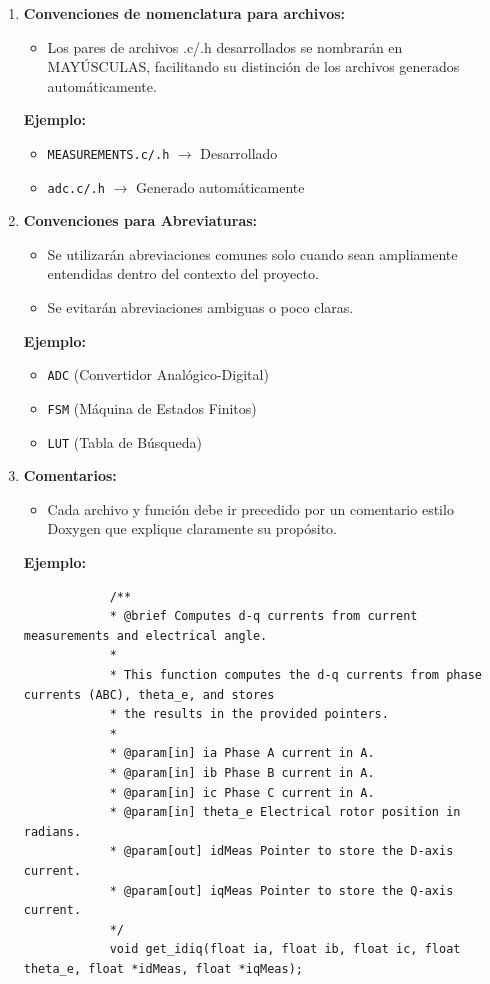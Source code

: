 \begin{enumerate}
\begin{itemize}
	\end{itemize}
	\item \textbf{Convenciones de nomenclatura para archivos:}
	\begin{itemize}
		\item Los pares de archivos .c/.h desarrollados se nombrarán en MAYÚSCULAS, facilitando su distinción de los archivos generados automáticamente.
	\end{itemize}
	\textbf{Ejemplo:}
	\begin{itemize}
		\item \texttt{MEASUREMENTS.c/.h} $\rightarrow$ Desarrollado
		\item \texttt{adc.c/.h} $\rightarrow$ Generado automáticamente
	\end{itemize}
	\item \textbf{Convenciones para Abreviaturas:}
	\begin{itemize}
		\item Se utilizarán abreviaciones comunes solo cuando sean ampliamente entendidas dentro del contexto del proyecto.
		\item Se evitarán abreviaciones ambiguas o poco claras.
	\end{itemize}
	\textbf{Ejemplo:}
	\begin{itemize}
		\item \texttt{ADC} (Convertidor Analógico-Digital)
		\item \texttt{FSM} (Máquina de Estados Finitos)
		\item \texttt{LUT} (Tabla de Búsqueda)
	\end{itemize}
	\item \textbf{Comentarios:}
	\begin{itemize}
		\item Cada archivo y función debe ir precedido por un comentario estilo Doxygen que explique claramente su propósito.
	\end{itemize}
	\textbf{Ejemplo:}
	{\small\begin{verbatim}		
			/**
			* @brief Computes d-q currents from current measurements and electrical angle.
			*
			* This function computes the d-q currents from phase currents (ABC), theta_e, and stores
			* the results in the provided pointers.
			*
			* @param[in] ia Phase A current in A.
			* @param[in] ib Phase B current in A.
			* @param[in] ic Phase C current in A.
			* @param[in] theta_e Electrical rotor position in radians.
			* @param[out] idMeas Pointer to store the D-axis current.
			* @param[out] iqMeas Pointer to store the Q-axis current.
			*/
			void get_idiq(float ia, float ib, float ic, float theta_e, float *idMeas, float *iqMeas);
	\end{verbatim}}
\end{enumerate}



